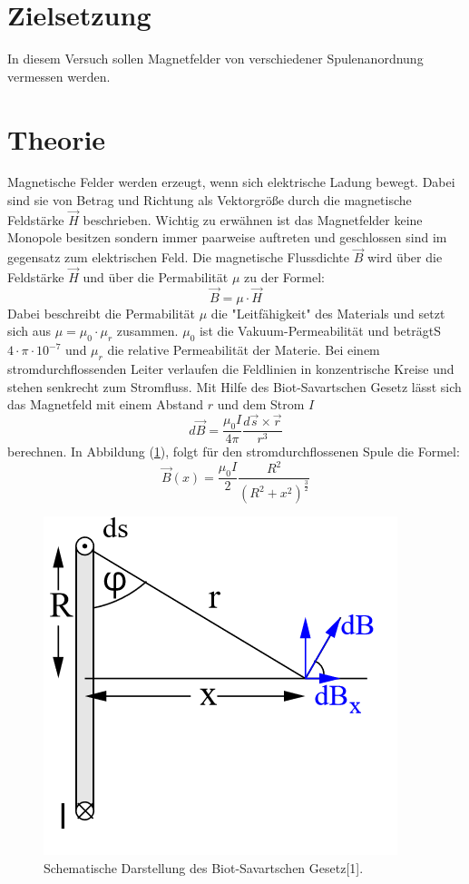\section{Zielsetzung}
In diesem Versuch sollen Magnetfelder von verschiedener Spulenanordnung vermessen werden.
\section{Theorie}
Magnetische Felder werden erzeugt, wenn sich elektrische Ladung bewegt.
Dabei sind sie von Betrag und Richtung als Vektorgröße durch die magnetische Feldstärke
$\vec{H}$ beschrieben. Wichtig zu erwähnen ist das Magnetfelder keine Monopole besitzen
sondern immer paarweise auftreten und geschlossen sind im gegensatz zum elektrischen Feld.
Die magnetische Flussdichte $\vec{B}$ wird über die Feldstärke $\vec{H}$ und über die
Permabilität $\mu$ zu der Formel:
\begin{equation}
  \vec{B} = \mu \cdot \vec{H}
  \label{eq:1}
\end{equation}
Dabei beschreibt die Permabilität $\mu$ die "Leitfähigkeit" des Materials und setzt sich
aus $\mu = \mu_0 \cdot \mu_r$ zusammen. $\mu_0$ ist die Vakuum-Permeabilität und beträgtS $4 \cdot \pi \cdot 10^{-7}$
und $\mu_r$ die relative Permeabilität der Materie.
Bei einem stromdurchflossenden Leiter verlaufen die Feldlinien in konzentrische Kreise und
stehen senkrecht zum Stromfluss. Mit Hilfe des Biot-Savartschen Gesetz lässt sich
das Magnetfeld mit einem Abstand $r$ und dem Strom $I$
\begin{equation*}
  d\vec{B} = \frac{\mu_0 I}{4\pi} \frac{d\vec{s} \times \vec{r}}{r^3}
\end{equation*}
berechnen. In Abbildung (\ref{abb:1}), folgt für den stromdurchflossenen Spule die Formel:
\begin{equation}
  \vec{B}(x) = \frac{\mu_0 I}{2} \frac{R^2}{(R^2 + x^2)^{\frac{3}{2}}}
  \label{eq:2}
\end{equation}
\begin{figure}[H]
  \centering
  \includegraphics[width=5 cm , height=3.5 cm]{Abb1.png}
	\caption{Schematische Darstellung des Biot-Savartschen Gesetz[1].}
	\label{abb:1}
\end{figure}
